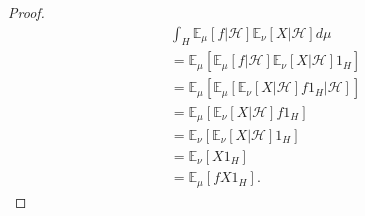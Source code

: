\begin{proof}
	\begin{align*}
		&\int _H \mathbb{E}_\mu\left[ f | \mathcal{H} \right] \mathbb{E}_\nu \left[ X | \mathcal{H} \right]  d \mu \\
        &= \mathbb{E}_\mu\left[ \mathbb{E}_\mu\left[ f | \mathcal{H} \right] \mathbb{E}_\nu \left[ X | \mathcal{H} \right] 1_H \right]  \\
        &= \mathbb{E}_\mu\left[ \mathbb{E}_\mu \left[ \mathbb{E}_\nu \left[ X | \mathcal{H} \right] f 1_H | \mathcal{H} \right]  \right]  \\
        &= \mathbb{E}_\mu \left[ \mathbb{E}_\nu \left[ X | \mathcal{H} \right] f 1_H \right] \\
        &= \mathbb{E}_\nu \left[ \mathbb{E}_\nu \left[ X | \mathcal{H} \right] 1_H \right] \\
        &= \mathbb{E}_\nu \left[ X 1_H \right] \\
        &= \mathbb{E}_\mu \left[ fX 1_H \right] 
	.\end{align*}
\end{proof}


